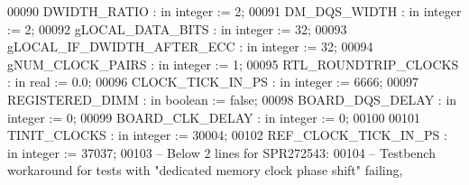 \begin{DoxyCode}
00090         \textcolor{vhdlchar}{DWIDTH_RATIO}           \textcolor{vhdlchar}{:} \textcolor{keywordflow}{in} \textcolor{comment}{integer} \textcolor{vhdlchar}{:=} \textcolor{vhdllogic}{}\textcolor{vhdllogic}{2};
00091         \textcolor{vhdlchar}{DM_DQS_WIDTH}           \textcolor{vhdlchar}{:} \textcolor{keywordflow}{in} \textcolor{comment}{integer} \textcolor{vhdlchar}{:=} \textcolor{vhdllogic}{}\textcolor{vhdllogic}{2};
00092         \textcolor{vhdlchar}{gLOCAL_DATA_BITS}       \textcolor{vhdlchar}{:} \textcolor{keywordflow}{in} \textcolor{comment}{integer} \textcolor{vhdlchar}{:=} \textcolor{vhdllogic}{}\textcolor{vhdllogic}{32};
00093         \textcolor{vhdlchar}{gLOCAL_IF_DWIDTH_AFTER_ECC} \textcolor{vhdlchar}{:} \textcolor{keywordflow}{in} \textcolor{comment}{integer} \textcolor{vhdlchar}{:=} \textcolor{vhdllogic}{}\textcolor{vhdllogic}{32};
00094         \textcolor{vhdlchar}{gNUM_CLOCK_PAIRS}       \textcolor{vhdlchar}{:} \textcolor{keywordflow}{in} \textcolor{comment}{integer} \textcolor{vhdlchar}{:=} \textcolor{vhdllogic}{}\textcolor{vhdllogic}{1};
00095         \textcolor{vhdlchar}{RTL_ROUNDTRIP_CLOCKS}   \textcolor{vhdlchar}{:} \textcolor{keywordflow}{in} \textcolor{comment}{real}    \textcolor{vhdlchar}{:=} \textcolor{vhdllogic}{}\textcolor{vhdllogic}{0}.\textcolor{vhdllogic}{0};
00096         \textcolor{vhdlchar}{CLOCK_TICK_IN_PS}       \textcolor{vhdlchar}{:} \textcolor{keywordflow}{in} \textcolor{comment}{integer} \textcolor{vhdlchar}{:=} \textcolor{vhdllogic}{}\textcolor{vhdllogic}{6666};
00097         REGISTERED\_DIMM        : \textcolor{keywordflow}{in} \textcolor{comment}{boolean} := false;
00098         \textcolor{vhdlchar}{BOARD_DQS_DELAY}        \textcolor{vhdlchar}{:} \textcolor{keywordflow}{in} \textcolor{comment}{integer} \textcolor{vhdlchar}{:=} \textcolor{vhdllogic}{}\textcolor{vhdllogic}{0};
00099         \textcolor{vhdlchar}{BOARD_CLK_DELAY}        \textcolor{vhdlchar}{:} \textcolor{keywordflow}{in} \textcolor{comment}{integer} \textcolor{vhdlchar}{:=} \textcolor{vhdllogic}{}\textcolor{vhdllogic}{0};
00100 
00101         \textcolor{vhdlchar}{TINIT_CLOCKS}           \textcolor{vhdlchar}{:} \textcolor{keywordflow}{in} \textcolor{comment}{integer} \textcolor{vhdlchar}{:=} \textcolor{vhdllogic}{}\textcolor{vhdllogic}{30004};
00102         \textcolor{vhdlchar}{REF_CLOCK_TICK_IN_PS}   \textcolor{vhdlchar}{:} \textcolor{keywordflow}{in} \textcolor{comment}{integer} \textcolor{vhdlchar}{:=} \textcolor{vhdllogic}{}\textcolor{vhdllogic}{37037};
00103 \textcolor{keyword}{        -- Below 2 lines for SPR272543: }
00104 \textcolor{keyword}{        -- Testbench workaround for tests with "dedicated memory clock phase shift" failing, }

\end{DoxyCode}
